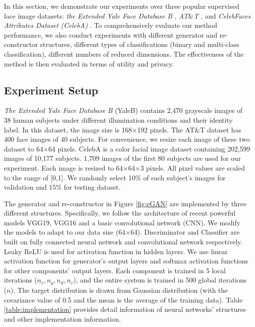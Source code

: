 In this section, we demonstrate our experiments over three popular supervised face image datasets: \textit{the Extended Yale Face Database B} \cite{GeBeKr01}, \textit{AT}\&\textit{T} \cite{341300}, and \textit{CelebFaces Attributes Dataset (CelebA)} \cite{celeba}. To comprehensively evaluate our method performance, we also conduct experiments with different generator and re-constructor structures, different types of classifications (binary and multi-class classification), different numbers of reduced dimensions. The effectiveness of the method is then evaluated in terms of utility and privacy.   
\subsection{Experiment Setup}
\textit{The Extended Yale Face Database B} (YaleB) contains 2,470 grayscale images of 38 human subjects under different illumination conditions and their identity label. In this dataset, the image size is 168$\times$192 pixels. The AT\&T dataset has 400 face images of 40 subjects. For convenience, we resize each image of these two dataset to 64$\times$64 pixels. CelebA is a color facial image dataset containing 202,599 images of 10,177 subjects. 1,709 images of the first 80 subjects are used for our experiment. Each image is resized to 64$\times$64$\times$3 pixels. All pixel values are scaled to the range of [0,1]. We randomly select 10\% of each subject's images for validation and 15\% for testing dataset. 

The generator and re-constructor in Figure \ref{fig:eGAN} are implemented by three different structures. Specifically, we follow the architecture of recent powerful models VGG19, VGG16 \cite{vgg} and a basic convolutional network (CNN). We modify the models to adapt to our data size (64$\times$64). Discriminator and Classifier are built on fully connected neural network and convolutional network respectively. Leaky ReLU is used for activation function in hidden layers. We use linear activation function for generator's output layers and softmax activation functions for other components' output layers. Each component is trained in 5 local iterations ($n_r, n_g, n_d, n_c$), and the entire system is trained in 500 global iterations ($n$). The target distribution is drawn from Gaussian distribution (with the covariance value of 0.5 and the mean is the average of the training data). Table \ref{table:implementation} provides detail information of neural networks' structures and other implementation information. 
 
